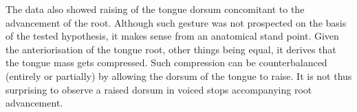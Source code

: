 \documentclass[]{elsarticle}
\begin{document}
The data also showed raising of the tongue dorsum concomitant to the
advancement of the root. Although such gesture was not prospected on the
basis of the tested hypothesis, it makes sense from an anatomical stand
point. Given the anteriorisation of the tongue root, other things being
equal, it derives that the tongue mass gets compressed. Such compression
can be counterbalanced (entirely or partially) by allowing the dorsum of
the tongue to raise. It is not thus surprising to observe a raised
dorsum in voiced stops accompanying root advancement.


\end{document}

